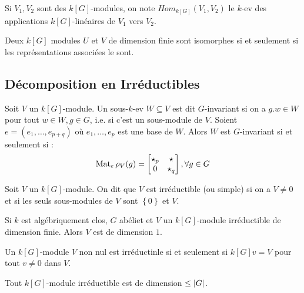 \documentclass{cours}
\begin{document}
\begin{definition}
    Si $V_{1}, V_{2}$ sont des $k[G]$-modules, on note $Hom_{k[G]}(V_{1}, V_{2})$ le $k$-ev des applications $k[G]$-linéaires de $V_{1}$ vers $V_{2}$.
\end{definition}

\begin{proposition}
    Deux $k[G]$ modules $U$ et $V$ de dimension finie sont isomorphes si et seulement si les représentations associées le sont.
\end{proposition}

\subsection{Décomposition en Irréductibles}
\begin{definition}
    Soit $V$ un $k[G]$-module. Un sous-$k$-ev $W \subseteq V$ est dit $G$-invariant si on a $g.w \in W$ pour tout $w \in W, g \in G$, i.e. si c'est un sous-module de $V$. Soient $e = \left(e_{1}, \ldots, e_{p +q}\right)$ où $e_{1}, \ldots, e_{p}$ est une base de $W$. Alors $W$ est $G$-invariant si et seulement si :
    \[
        \operatorname{Mat}_{e}\rho_{V}(g) = \left[\begin{matrix}
                \star_{p} & \star     \\
                0         & \star_{q}
            \end{matrix}\right], \forall g \in G
    \]
\end{definition}

\begin{definition}
    Soit $V$ un $k[G]$-module. On dit que $V$ est irréductible (ou simple) si on a $V \neq 0$ et si les seuls sous-modules de $V$ sont $\left\{0\right\}$ et $V$.
\end{definition}
\begin{proposition}
    Si $k$ est algébriquement clos, $G$ abéliet et $V$ un $k[G]$-module irréductible de dimension finie. Alors $V$ est de dimension $1$.
\end{proposition}
\begin{proposition}
    Un $k[G]$-module $V$ non nul est irréductinle si et seulement si $k[G]v = V$ pour tout $v \neq 0$ dans $V$.
\end{proposition}

\begin{proposition}
    Tout $k[G]$-module irréductible est de dimension $\leq\left|G\right|$.
\end{proposition}
\end{document}
